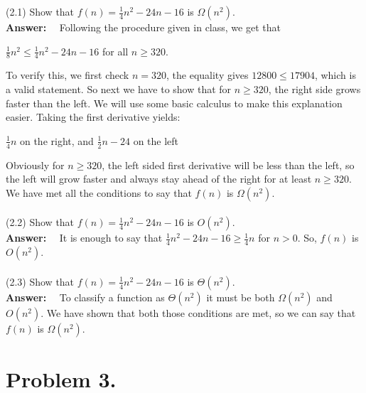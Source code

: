 \documentclass[11pt]{article}
\begin{document}
\noindent
(2.1) Show that $f(n)=\frac{1}{4}n^2-24n-16$ is $\Omega(n^2)$.\\
\noindent
{\bf Answer:}~~
Following the procedure given in class, we get that 
\begin{center}
    $\frac{1}{8}n^2 \leq \frac{1}{4}n^2 -24n -16$ for all $n\geq 320$.
\end{center}
To verify this, we first check $n=320$, the equality gives $12800 \leq 17904$, which is a valid statement. So  next we have to show that for $n\geq 320$, the right side grows faster than the left. We will use some basic calculus to make this explanation easier. Taking the first derivative yields:
\begin{center}
    $\frac{1}{4}n$ on the right, and $\frac{1}{2}n - 24$  on the left
\end{center}
Obviously for $n\geq 320$, the left sided first derivative will be less than the left, so the left will grow faster and always stay ahead of the right for at least $n\geq 320$. We have met all the conditions to say that $f(n)$ is $\Omega(n^2)$.\\\\

\noindent
(2.2) Show that $f(n)=\frac{1}{4}n^2-24n-16$ is $O(n^2)$.\\
\noindent
{\bf Answer:}~~
It is enough to say that $\frac{1}{4}n^2 -24n -16 \geq \frac{1}{4}n$ for $n>0$. So, $f(n)$ is $O(n^2)$.\\\\

\noindent
(2.3) Show that $f(n)=\frac{1}{4}n^2-24n-16$ is $\Theta(n^2)$.\\
\noindent
{\bf Answer:}~~
To classify a function as $\Theta(n^2)$ it must be both $\Omega(n^2)$ and $O(n^2)$. We have shown that both those conditions are met, so we can say that $f(n)$ is $\Omega(n^2)$.

\newpage

\section*{Problem 3.}
\end{document}

